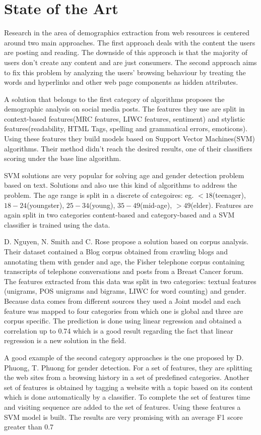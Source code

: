 \section{State of the Art}

Research in the area of demographics extraction from web resources is centered around two main approaches. The first approach deals with the content the users are posting and reading. The downside of this approach is that the majority of users don't create any content and are just consumers. The second approach aims to fix this problem by analyzing the users' browsing behaviour by treating the words and hyperlinks and other web page components as hidden attributes.

A solution that belongs to the first category of algorithms proposes the demographic analysis on social media posts\cite{Marquardt}. The features they use are split in context-based features(MRC features, LIWC features, sentiment) and stylistic features(readability, HTML Tags, spelling and grammatical errors, emoticons). Using these features they build models based on Support Vector Machines(SVM) algorithms. Their method didn't reach the desired results, one of their classifiers scoring under the base line algorithm.

SVM solutions are very popular for solving age and gender detection problem based on text. Solutions \cite{Hu} and \cite{Kabbur} also use this kind of algorithms to address the problem. The age range is split in a discrete of categoires: eg. $<18$(teenager), $18-24$(youngster), $25-34$(young), $35-49$(mid-age), $>49$(elder). Features are again split in two categories content-based and category-based and a SVM classifier is trained using the data.

D. Nguyen, N. Smith and C. Rose\cite{Nguyen} propose a solution based on corpus analysis.  Their dataset contained a Blog corpus obtained from crawling blogs and annotating them with gender and age, the Fisher telephone corpus containing transcripts of telephone conversations and posts from a Breast Cancer forum. The features extracted from this data was split in two categories: textual features (unigrams, POS unigrams and bigrams, LIWC for word counting) and gender. Because data comes from different sources they used a Joint model and each feature was mapped to four categories from which one is global and three are corpus specific. The prediction is done using linear regression and obtained a correlation up to 0.74 which is a good result regarding the fact that linear regression is a new solution in the field.

A good example of the second category approaches is the one proposed by D. Phuong, T. Phuong\cite{Phuong} for gender detection. For a set of features, they are splitting the web sites from a browsing history in a set of predefined categories. Another set of features is obtained by tagging a website with a topic based on its content which is done automatically by a classifier. To complete the set of features time and visiting sequence are added to the set of features. Using these features a SVM model is built. The results are very promising with an average F1 score greater than 0.7
 